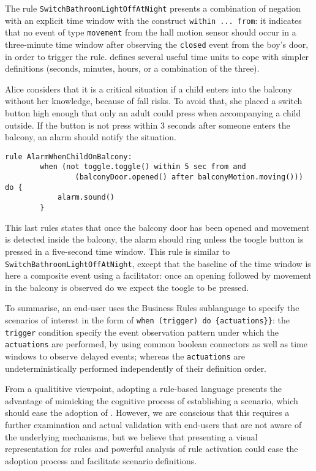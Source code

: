 \begin{description}[leftmargin=0cm]
	The rule \lstinline[language=iotdsl]{SwitchBathroomLightOffAtNight} presents a combination of negation with an explicit time window with the construct \lstinline[language=iotdsl]{within ... from}: it indicates that no event of type \lstinline[language=iotdsl]{movement} from the hall motion sensor should occur in a three-minute time window after observing the \lstinline[language=iotdsl]{closed} event from the boy's door, in order to trigger the rule. \IOTDSL defines several useful time units to cope with simpler definitions (seconds, minutes, hours, or a combination of the three). 
	

	\item[Report unsupervised children on balcony] Alice considers that it is a critical situation if a child enters into the balcony without her knowledge, because of fall risks. To avoid that, she placed a switch button high enough that only an adult could press when accompanying a child outside. If the button is not press within 3 seconds after someone enters the balcony, an alarm should notify the situation.
	\begin{lstlisting}[language=iotdsl,
							label=lis:balcony-rule,
		caption=Rules to ring the alarm in case of an unsupervised child in the balcony]
	rule AlarmWhenChildOnBalcony:	
		when (not toggle.toggle() within 5 sec from and
				(balconyDoor.opened() after balconyMotion.moving())) do {
			alarm.sound()
		}
	\end{lstlisting}
	This last rules states that once the balcony door has been opened and movement is detected inside the balcony, the alarm should ring unless the toogle button is pressed in a five-second time window. This rule is similar to \lstinline[language=iotdsl]{SwitchBathroomLightOffAtNight}, except that the baseline of the time window is here a composite event using a facilitator: once an opening followed by movement in the balcony is observed do we expect the toogle to be pressed. 
\end{description}
To summarise, an end-user uses the Business Rules sublanguage to specify the scenarios of interest in the form of \lstinline[language=iotdsl]!when (trigger) do {actuations}}!: the \lstinline[language=iotdsl]{trigger} condition specify the event observation pattern under which the \lstinline[language=iotdsl]{actuations} are performed, by using common boolean connectors as well as time windows to observe delayed events; whereas the \lstinline[language=iotdsl]{actuations} are undeterministically performed independently of their definition order. 

From a qualititive viewpoint, adopting a rule-based language presents the advantage of mimicking the cognitive process of establishing a scenario, which should ease the adoption of \IOTDSL. However, we are conscious that this requires a further examination and actual validation with end-users that are not aware of the underlying \DSL mechanisms, but we believe that presenting a visual representation for rules and powerful analysis of rule activation could ease the adoption process and facilitate scenario definitions.




